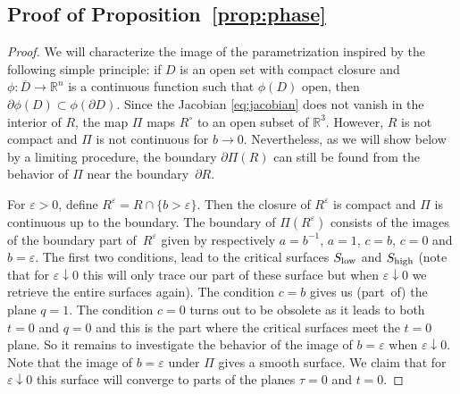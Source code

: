 \documentclass[pdftex]{sigma}
\newcommand{\eps}{\varepsilon}
\numberwithin{equation}{section}
\begin{document}
\subsection{Proof of Proposition~\ref{prop:phase}}
\begin{proof}
We will characterize the image of the parametrization inspired by the following simple principle: if $D$ is an open set with compact closure and $\phi\colon \overline D\to \mathbb R^n$ is a continuous function such that $\phi(D)$ open, then $\partial \phi(D) \subset\phi(\partial D)$. Since the Jacobian \eqref{eq:jacobian} does not vanish in the interior of $R$, the map $\Pi$ maps $R^\circ$ to an open subset of $\mathbb R^3$. However, $R$ is not compact and $\Pi$ is not continuous for $b\to 0$. Nevertheless, as we will show below by a limiting procedure, the boundary $\partial \Pi(R)$ can still be found from the behavior of $\Pi$ near the boundary~$\partial R$.

For $\eps>0$, define
$ R^{\eps}=R \cap \{ b > \eps\}.$
Then the closure of $R^{\eps}$ is compact and $\Pi$ is continuous up to the boundary. The boundary of $\Pi(R^{\eps})$ consists of the images of the boundary part of~$R^{\eps}$ given by respectively $a=b^{-1}$, $a=1$, $c=b$, $c=0$ and $b=\eps$. The first two conditions, lead to the critical surfaces $S_{{\rm low}}$ and $S_{{\rm high}}$ (note that for $\eps \downarrow 0$ this will only trace our part of these surface but when $\eps \downarrow 0$ we retrieve the entire surfaces again). The condition $c=b$ gives us (part~of) the plane $q=1$. The condition $c=0$ turns out to be obsolete as it leads to both~${t=0}$ and $q=0$ and this is the part where the critical surfaces meet the $t=0$ plane. So it remains to investigate the behavior of the image of $b=\eps$ when $\eps \downarrow 0$. Note that the image of $b=\eps$ under $\Pi$ gives a smooth surface. We claim that for $\eps \downarrow 0$ this surface will converge to parts of the planes $\tau=0$
 and $t=0$.


\end{proof}
\end{document}
